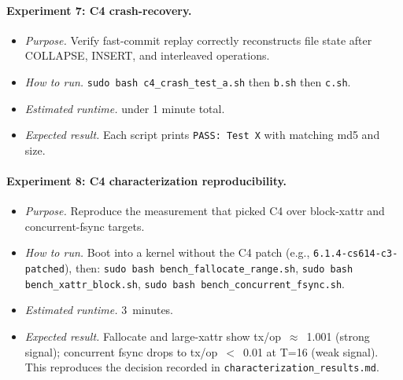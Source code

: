\documentclass[11pt,a4paper]{article}
\begin{document}
\paragraph{Experiment 7: C4 crash-recovery.}
\begin{itemize}[leftmargin=*]
  \item \textit{Purpose.} Verify fast-commit replay correctly
        reconstructs file state after COLLAPSE, INSERT, and
        interleaved operations.
  \item \textit{How to run.} \texttt{sudo bash c4\_crash\_test\_a.sh}
        then \texttt{b.sh} then \texttt{c.sh}.
  \item \textit{Estimated runtime.} under 1 minute total.
  \item \textit{Expected result.} Each script prints
        \texttt{PASS: Test X} with matching md5 and size.
\end{itemize}

\paragraph{Experiment 8: C4 characterization reproducibility.}
\begin{itemize}[leftmargin=*]
  \item \textit{Purpose.} Reproduce the measurement that picked C4
        over block-xattr and concurrent-fsync targets.
  \item \textit{How to run.} Boot into a kernel without the C4 patch
        (e.g., \texttt{6.1.4-cs614-c3-patched}), then:
        \texttt{sudo bash bench\_fallocate\_range.sh},
        \texttt{sudo bash bench\_xattr\_block.sh},
        \texttt{sudo bash bench\_concurrent\_fsync.sh}.
  \item \textit{Estimated runtime.} 3~minutes.
  \item \textit{Expected result.} Fallocate and large-xattr show
        tx/op~$\approx$~1.001 (strong signal); concurrent fsync
        drops to tx/op~$<$~0.01 at T=16 (weak signal). This
        reproduces the decision recorded in
        \texttt{characterization\_results.md}.
\end{itemize}
\end{document}
